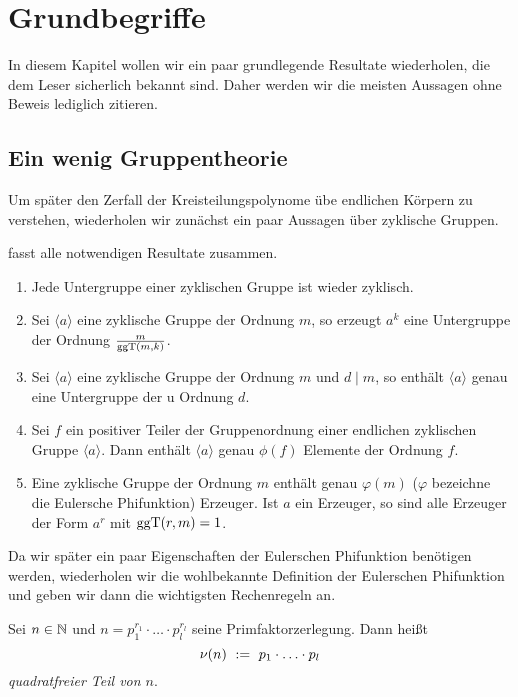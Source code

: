 \chapter{Grundbegriffe}
\label{chap:grundbegriffe}

In diesem Kapitel wollen wir ein paar grundlegende Resultate wiederholen, die
dem Leser sicherlich bekannt sind. Daher werden wir die meisten Aussagen ohne
Beweis lediglich zitieren.

\section{Ein wenig Gruppentheorie}

Um später den Zerfall der Kreisteilungspolynome übe endlichen Körpern zu
verstehen, wiederholen wir zunächst ein paar Aussagen über zyklische Gruppen.

\autocite[Theorem 1.15]{lidl1997finite} fasst alle notwendigen Resultate
zusammen.

\begin{satz}
  \label{satz:zykl_gruppen}
  \begin{enumerate}
    \item Jede Untergruppe einer zyklischen Gruppe ist wieder zyklisch.
    \item Sei $\langle a \rangle$ eine zyklische Gruppe der Ordnung $m$,
      so erzeugt $a^k$ eine Untergruppe der Ordnung $\frac{m}{\operatorname{ggT}(m,k)}$.
    \item Sei $\langle a\rangle$ eine zyklische Gruppe der Ordnung $m$ und
      $d \mid m$, so enthält $\langle a \rangle$ genau eine Untergruppe der
  u    Ordnung $d$.
     \item Sei $f$ ein positiver Teiler der Gruppenordnung einer endlichen
        zyklischen Gruppe $\langle a \rangle$. Dann enthält $\langle a \rangle$
        genau $\phi(f)$ Elemente der Ordnung $f$.
     \item Eine zyklische Gruppe der Ordnung $m$ enthält genau $\varphi(m)$
        ($\varphi$ bezeichne die Eulersche Phifunktion)
        Erzeuger. Ist $a$ ein Erzeuger, so sind alle Erzeuger der Form
        $a^r$ mit $\operatorname{ggT}(r,m) = 1$.
  \end{enumerate}
\end{satz}

Da wir später ein paar Eigenschaften der Eulerschen Phifunktion benötigen
werden, wiederholen wir die wohlbekannte Definition der Eulerschen
Phifunktion und geben wir dann die wichtigsten Rechenregeln an.

\begin{definition}
  Sei $n \in \mathbb{N}$ und $n = p_1^{r_1}\cdot\ldots\cdot p_l^{r_l}$ seine
  Primfaktorzerlegung. Dann heißt
  \[ \nu(n) \ :=\  p_1\cdot \ldots\cdot p_l\]
  \emph{quadratfreier Teil von $n$}.
\end{definition}



